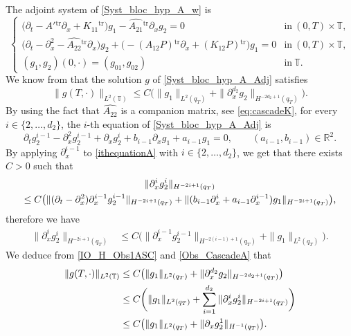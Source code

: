 \documentclass[10pt]{amsart}
\theoremstyle{plain}
\theoremstyle{definition}
\theoremstyle{remark}
\newcommand{\set}{\mathbb}
\newcommand{\R}{} %
\renewcommand{\R}{\set{R}}
\newcommand{\T}{\set{T}}
\newcommand{\Tr}[1]{{#1}{}^{\mathrm{tr}}}
\let\originalleft\left
\let\originalright\right
\renewcommand{\left}{\mathopen{}\mathclose\bgroup\originalleft}
\renewcommand{\right}{\aftergroup\egroup\originalright}
\begin{document}
The adjoint system of \eqref{Syst_bloc_hyp_A_w} is
\begin{equation} \label{Syst_bloc_hyp_A_Adj}
\begin{cases}
\bigl(\partial_t -\Tr{A'}\partial_x+\Tr{K_{11}}\bigr)g_1 - \Tr{\widehat{A_{21}}}\partial_x g_2= 0
&\text{in}\ (0,T)\times \T,\!\\
\bigl(\partial_t - \partial_x^2-\Tr{\widehat{A_{22}}}\partial_x\bigr)g_2 +\bigl(-\Tr{(A_{12}P)}\partial_x+\Tr{(K_{12}P)}\bigr)g_1 = 0 &\text{in}\ (0,T)\times \T,\!\\
(g_1,g_2)(0,\cdot)=(g_{01},g_{02}) & \text{in}\ \T.
\end{cases}
\end{equation}
\normalsize
We know from  that the solution $g$ of \eqref{Syst_bloc_hyp_A_Adj} satisfies
\begin{equation} \label{IO_H_Obs1ASC}
\| g(T,\cdot) \|_{L^2(\T)} \leq C \bigl(\| g_1\|_{L^2(q_T)} + \|\partial_{x}^{d_2} g_2\|_{H^{-2d_2+1}(q_T)} \bigr).
\end{equation}
By using the fact that $\widehat{A_{22}}$ is a companion matrix, see \eqref{eq:cascadeK}, for every $i \in \{2, \dots, d_2\}$, the $i$-th equation of \eqref{Syst_bloc_hyp_A_Adj} is
\begin{equation}
\partial_t g_2^{i-1} - \partial_x^2 g_2^{i-1} + \partial_{x} g_2^{i} + b_{i-1} \partial_x g_1+ a_{i-1} g_1 =0,\qquad (a_{i-1}, b_{i-1}) \in \R^2.
\label{ithequationA}
\end{equation}
By applying $\partial_{x}^{i-1}$ to \eqref{ithequationA} with $i \in \{2, \dots, d_2\}$, we get that there exists $C>0$ such that
\begin{multline*}
\|\partial_{x}^{i} g_2^{i}\|_{H^{-2i + 1 }(q_T)}\\
\leq C \left(\|(\partial_t - \partial_{x}^2)\partial_x^{i-1} g_2^{i-1}\|_{H^{-2i+1}(q_T)} + \| (b_{i-1} \partial_x^{i}+ a_{i-1}\partial_{x}^{i-1}) g_1\|_{H^{-2i+1}(q_T)} \right),
\end{multline*}
therefore we have
\begin{align}
\|\partial_{x}^{i} g_2^{i}\|_{H^{-2i + 1 }(q_T)} &\leq C \bigl(\|\partial_x^{i-1} g_2^{i-1}\|_{H^{-2(i-1)+1}(q_T)} + \| g_1\|_{L^2(q_T)} \bigr).
\label{Obs_CascadeA}
\end{align}
We deduce from \eqref{IO_H_Obs1ASC} and \eqref{Obs_CascadeA} that
\begin{equation}\label{IO_H_Obs2A}
\begin{split}
\| g(T,\cdot) \|_{L^2(\T)} & \leq C \left(\| g_1\|_{L^2(q_T)} + \|\partial_{x}^{d_2} g_2\|_{H^{-2d_2+1}(q_T)} \right)\\
& \leq C \biggl(\| g_1\|_{L^2(q_T)} + \sum_{i=1}^{d_2}\|\partial_{x}^{i} g_2^{i}\|_{H^{-2i + 1 }(q_T)} \biggr)\\
&\leq C \bigl(\| g_1\|_{L^2(q_T)} + \|\partial_{x} g_2^1\|_{H^{-1}(q_T)} \bigr).
\end{split}
\end{equation}
\end{document}
